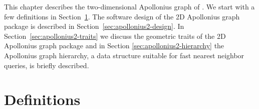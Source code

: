 


This chapter describes the two-dimensional Apollonius graph
of \cgal. We start with a few definitions in 
Section~\ref{sec:apollonius2-definitions}.
The software design of the 2D Apollonius graph package is described 
in Section~\ref{sec:apollonius2-design}.
In Section~\ref{sec:apollonius2-traits} we discuss the geometric
traits of the 2D Apollonius graph package and in Section
\ref{sec:apollonius2-hierarchy} the Apollonius graph hierarchy, a data
structure suitable for fast nearest neighbor queries, is briefly
described.


\section{Definitions}
\label{sec:apollonius2-definitions}

